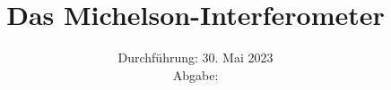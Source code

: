 

\subject{\texorpdfstring{\vspace{2ex}}{}V401\texorpdfstring{\vspace{-2ex}}{}} %
\title{Das Michelson-Interferometer} %
\date{
	Durchführung: 30. Mai 2023 %
	\\ Abgabe:%
}




\maketitle
\thispagestyle{empty}


\tableofcontents
\newpage







\printbibliography{}

\newpage



